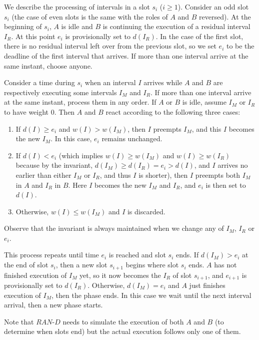 \documentclass[11pt]{article}
\begin{document}
We describe the processing of intervals in a slot $s_i$ ($i \ge 1$).
Consider an odd slot $s_i$ (the case of even slots is the same with the
roles of $A$ and $B$ reversed).
At the beginning of $s_i$, $A$ is idle and 
$B$ is continuing the execution of a residual interval $I_R$. 
At this point $e_i$ is provisionally set to $d(I_R)$.
In the case of the first slot, there is no residual interval left over
from the previous slot, so we set $e_i$ to be the deadline of the first
interval that arrives. If more than one interval arrive at the same instant,
choose anyone.
 
Consider a time during $s_i$ when an interval $I$ arrives while
$A$ and $B$ are respectively executing some intervals $I_M$ and $I_R$.
If more than one interval arrive at the same instant, process them in any
order.
If $A$ or $B$ is idle, assume $I_M$ or $I_R$ to have weight 0.
Then $A$ and $B$ react according to the following three cases:

\begin{enumerate}
\item
If $d(I) \ge e_i$ and $w(I)>w(I_M)$,
then $I$ preempts $I_M$, and this $I$ becomes the new $I_M$.
In this case, $e_i$ remains unchanged.
\item
If $d(I) < e_i$ (which implies $w(I) \ge w(I_M)$ and $w(I) \ge w(I_R)$
because by the invariant, $d(I_M) \ge d(I_R) = e_i > d(I)$, 
and $I$ arrives no earlier than either $I_M$ or $I_R$, 
and thus $I$ is shorter),
then $I$ preempts both $I_M$ in $A$ and $I_R$ in $B$.
Here $I$ becomes the new $I_M$ and $I_R$, and
$e_i$ is then set to $d(I)$.  
\item
Otherwise, $w(I) \le w(I_M)$ and $I$ is discarded.
\end{enumerate}

Observe that the invariant is always maintained when we change any of $I_M$,
$I_R$ or $e_i$.

This process repeats until time $e_i$ is reached and slot $s_i$ ends.
If $d(I_M)>e_i$ at the end of slot $s_i$, then a new slot $s_{i+1}$ begins 
where slot $s_i$ ends.
$A$ has not finished execution of $I_M$ yet, so it
now becomes the $I_R$ of slot $s_{i+1}$, and
$e_{i+1}$ is provisionally set to $d(I_R)$.
Otherwise, $d(I_M)=e_i$ and $A$ just finishes execution of $I_M$, 
then the phase ends. 
In this case we wait until the next interval 
arrival, then a new phase starts.

Note that $RAN$-$D$ needs to simulate the execution of both $A$ and $B$
(to determine when slots end) but the actual execution follows only one 
of them.
\end{document}
